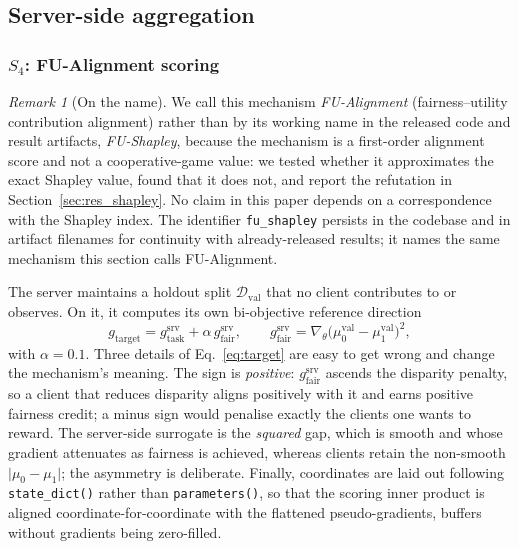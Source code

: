 \documentclass[preprint,12pt]{elsarticle}
\theoremstyle{plain}
\theoremstyle{definition}
\theoremstyle{remark}
\newtheorem{remark}{Remark}
\begin{document}
\subsection{Server-side aggregation}
\label{sec:server}

\subsubsection{\texorpdfstring{$S_4$:}{S4:} FU-Alignment scoring}

\begin{remark}[On the name]
\label{rem:naming}
We call this mechanism \emph{FU-Alignment} (fairness--utility contribution alignment) rather than by its working name in the released code and result artifacts, \emph{FU-Shapley}, because the mechanism is a first-order alignment score and not a cooperative-game value: we tested whether it approximates the exact Shapley value, found that it does not, and report the refutation in Section~\ref{sec:res_shapley}. No claim in this paper depends on a correspondence with the Shapley index. The identifier \texttt{fu\_shapley} persists in the codebase and in artifact filenames for continuity with already-released results; it names the same mechanism this section calls FU-Alignment.
\end{remark}
The server maintains a holdout split $\mathcal{D}_{\mathrm{val}}$ that no client contributes to or observes. On it, it computes its own bi-objective reference direction
\begin{equation}
g_{\mathrm{target}} = g_{\mathrm{task}}^{\mathrm{srv}} + \alpha\, g_{\mathrm{fair}}^{\mathrm{srv}},
\qquad
g_{\mathrm{fair}}^{\mathrm{srv}} = \nabla_\theta \big(\mu_0^{\mathrm{val}} - \mu_1^{\mathrm{val}}\big)^2 ,
\label{eq:target}
\end{equation}
with $\alpha = 0.1$. Three details of Eq.~\eqref{eq:target} are easy to get wrong and change the mechanism's meaning. The sign is \emph{positive}: $g_{\mathrm{fair}}^{\mathrm{srv}}$ ascends the disparity penalty, so a client that reduces disparity aligns positively with it and earns positive fairness credit; a minus sign would penalise exactly the clients one wants to reward. The server-side surrogate is the \emph{squared} gap, which is smooth and whose gradient attenuates as fairness is achieved, whereas clients retain the non-smooth $\lvert\mu_0 - \mu_1\rvert$; the asymmetry is deliberate. Finally, coordinates are laid out following \texttt{state\_dict()} rather than \texttt{parameters()}, so that the scoring inner product is aligned coordinate-for-coordinate with the flattened pseudo-gradients, buffers without gradients being zero-filled.
\end{document}
